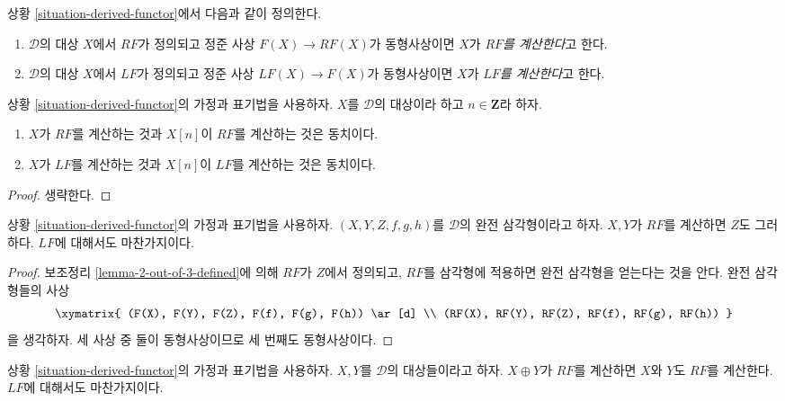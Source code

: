 \begin{definition}
\label{definition-computes}
상황 \ref{situation-derived-functor}에서 다음과 같이 정의한다.
\begin{enumerate}
\item $\mathcal{D}$의 대상 $X$에서 $RF$가 정의되고 정준 사상
$F(X) \to RF(X)$가 동형사상이면 $X$가 {\it $RF$를 계산한다}고 한다.
\item $\mathcal{D}$의 대상 $X$에서 $LF$가 정의되고 정준 사상
$LF(X) \to F(X)$가 동형사상이면 $X$가 {\it $LF$를 계산한다}고 한다.
\end{enumerate}
\end{definition}

\begin{lemma}
\label{lemma-computes-shift}
상황 \ref{situation-derived-functor}의 가정과 표기법을 사용하자.
$X$를 $\mathcal{D}$의 대상이라 하고 $n \in \mathbf{Z}$라 하자.
\begin{enumerate}
\item $X$가 $RF$를 계산하는 것과 $X[n]$이 $RF$를 계산하는 것은 동치이다.
\item $X$가 $LF$를 계산하는 것과 $X[n]$이 $LF$를 계산하는 것은 동치이다.
\end{enumerate}
\end{lemma}

\begin{proof}
생략한다.
\end{proof}

\begin{lemma}
\label{lemma-2-out-of-3-computes}
상황 \ref{situation-derived-functor}의 가정과 표기법을 사용하자.
$(X, Y, Z, f, g, h)$를 $\mathcal{D}$의 완전 삼각형이라고 하자.
$X, Y$가 $RF$를 계산하면 $Z$도 그러하다.
$LF$에 대해서도 마찬가지이다.
\end{lemma}

\begin{proof}
보조정리 \ref{lemma-2-out-of-3-defined}에 의해 $RF$가 $Z$에서 정의되고,
$RF$를 삼각형에 적용하면 완전 삼각형을 얻는다는 것을 안다.
완전 삼각형들의 사상
$$
\xymatrix{
(F(X), F(Y), F(Z), F(f), F(g), F(h)) \ar[d] \\
(RF(X), RF(Y), RF(Z), RF(f), RF(g), RF(h))
}
$$
을 생각하자. 세 사상 중 둘이 동형사상이므로 세 번째도 동형사상이다.
\end{proof}

\begin{lemma}
\label{lemma-direct-sum-computes}
상황 \ref{situation-derived-functor}의 가정과 표기법을 사용하자.
$X, Y$를 $\mathcal{D}$의 대상들이라고 하자. $X \oplus Y$가 $RF$를
계산하면 $X$와 $Y$도 $RF$를 계산한다. $LF$에 대해서도 마찬가지이다.
\end{lemma}

